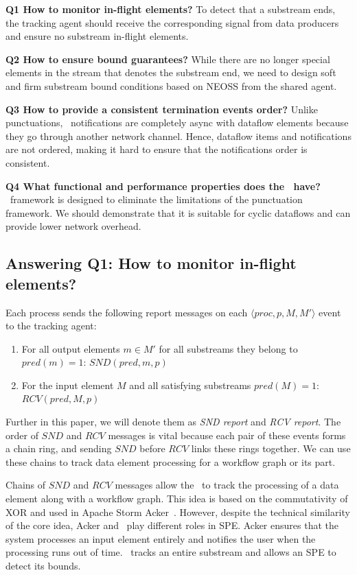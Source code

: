 {\bf Q1 How to monitor in-flight elements?} To detect that a substream ends, the tracking agent should receive the corresponding signal from data producers and ensure no substream in-flight elements. 

{\bf Q2 How to ensure bound guarantees?} While there are no longer special elements in the stream that denotes the substream end, we need to design soft and firm substream bound conditions based on NEOSS from the shared agent. 

{\bf Q3 How to provide a consistent termination events order?} Unlike punctuations, \tracker\ notifications are completely async with dataflow elements because they go through another network channel. Hence, dataflow items and notifications are not ordered, making it hard to ensure that the notifications order is consistent.

{\bf Q4 What functional and performance properties does the \tracker\ have?} \tracker\ framework is designed to eliminate the limitations of the punctuation framework. We should demonstrate that it is suitable for cyclic dataflows and can provide lower network overhead.

\subsection{Answering Q1: How to monitor in-flight elements?}
Each process sends the following report messages on each $\langle proc, p, M, M' \rangle$ event to the tracking agent:
\begin{enumerate}
    \item For all output elements $m \in M'$ for all substreams they belong to $pred(m) = 1$: $SND(pred, m, p)$
    \item For the input element $M$ and all satisfying substreams $pred(M) = 1$: $RCV(pred, M, p)$
\end{enumerate}
Further in this paper, we will denote them as {\em SND report} and {\em RCV report}. The order of $SND$ and $RCV$ messages is vital because each pair of these events forms a chain ring, and sending $SND$ before $RCV$ links these rings together. We can use these chains to track data element processing for a workflow graph or its part.

Chains of $SND$ and $RCV$ messages allow the \tracker\ to track the processing of a data element along with a workflow graph. This idea is based on the commutativity of XOR and used in Apache Storm Acker~\cite{apache:storm:acker}. However, despite the technical similarity of the core idea, Acker and \tracker\ play different roles in SPE. Acker ensures that the system processes an input element entirely and notifies the user when the processing runs out of time. \tracker\ tracks an entire substream and allows an SPE to detect its bounds.

